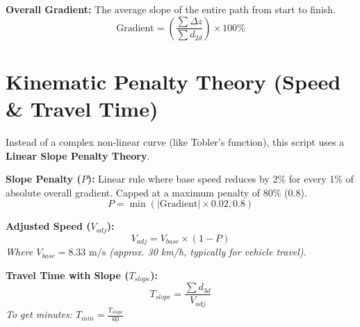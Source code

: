\documentclass[12pt, a4paper]{article}
\begin{document}
\textbf{Overall Gradient:} The average slope of the entire path from start to finish.
\begin{equation}
    \text{Gradient} = \left( \frac{\sum \Delta z}{\sum d_{2d}} \right) \times 100\%
\end{equation}

\section{Kinematic Penalty Theory (Speed \& Travel Time)}

Instead of a complex non-linear curve (like Tobler's function), this script uses a \textbf{Linear Slope Penalty Theory}.

\vspace{1em}
\textbf{Slope Penalty ($P$):} Linear rule where base speed reduces by 2\% for every 1\% of absolute overall gradient. Capped at a maximum penalty of 80\% (0.8).
\begin{equation}
    P = \min\left(|\text{Gradient}| \times 0.02, 0.8\right)
\end{equation}

\textbf{Adjusted Speed ($V_{adj}$):}
\begin{equation}
    V_{adj} = V_{base} \times (1 - P)
\end{equation}
\textit{Where $V_{base} = 8.33 \text{ m/s}$ (approx. 30 km/h, typically for vehicle travel).}

\vspace{1em}
\textbf{Travel Time with Slope ($T_{slope}$):}
\begin{equation}
    T_{slope} = \frac{\sum d_{3d}}{V_{adj}}
\end{equation}
\textit{To get minutes: $T_{min} = \frac{T_{slope}}{60}$}
\end{document}
